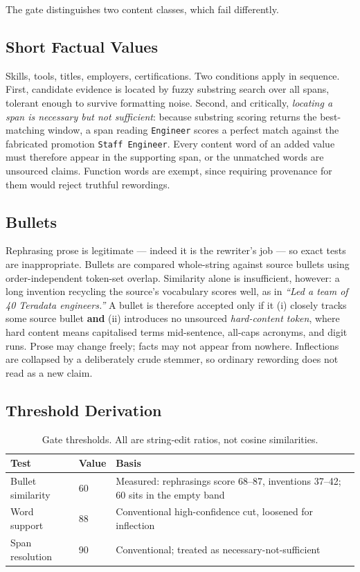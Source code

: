 \documentclass[conference]{IEEEtran}
\begin{document}
The gate distinguishes two content classes, which fail differently.

\subsection{Short Factual Values}

Skills, tools, titles, employers, certifications. Two conditions apply in
sequence. First, candidate evidence is located by fuzzy substring search over
all spans, tolerant enough to survive formatting noise. Second, and critically,
\emph{locating a span is necessary but not sufficient}: because substring
scoring returns the best-matching window, a span reading \texttt{Engineer}
scores a perfect match against the fabricated promotion \texttt{Staff
Engineer}. Every content word of an added value must therefore appear in the
supporting span, or the unmatched words are unsourced claims. Function words are
exempt, since requiring provenance for them would reject truthful rewordings.

\subsection{Bullets}

Rephrasing prose is legitimate --- indeed it is the rewriter's job --- so exact
tests are inappropriate. Bullets are compared whole-string against source
bullets using order-independent token-set overlap. Similarity alone is
insufficient, however: a long invention recycling the source's vocabulary scores
well, as in \emph{``Led a team of 40 Teradata engineers.''} A bullet is
therefore accepted only if it (i) closely tracks some source bullet
\textbf{and} (ii) introduces no unsourced \emph{hard-content token}, where hard
content means capitalised terms mid-sentence, all-caps acronyms, and digit runs.
Prose may change freely; facts may not appear from nowhere. Inflections are
collapsed by a deliberately crude stemmer, so ordinary rewording does not read
as a new claim.

\subsection{Threshold Derivation}

\begin{table}[t]
\centering
\caption{Gate thresholds. All are string-edit ratios, not cosine similarities.}
\label{tab:thresholds}
\begin{tabular}{@{}llp{3.6cm}@{}}
\toprule
Test & Value & Basis \\
\midrule
Bullet similarity & 60 & Measured: rephrasings score 68--87, inventions 37--42; 60 sits in the empty band \\
Word support & 88 & Conventional high-confidence cut, loosened for inflection \\
Span resolution & 90 & Conventional; treated as necessary-not-sufficient \\
\bottomrule
\end{tabular}
\end{table}
\end{document}
